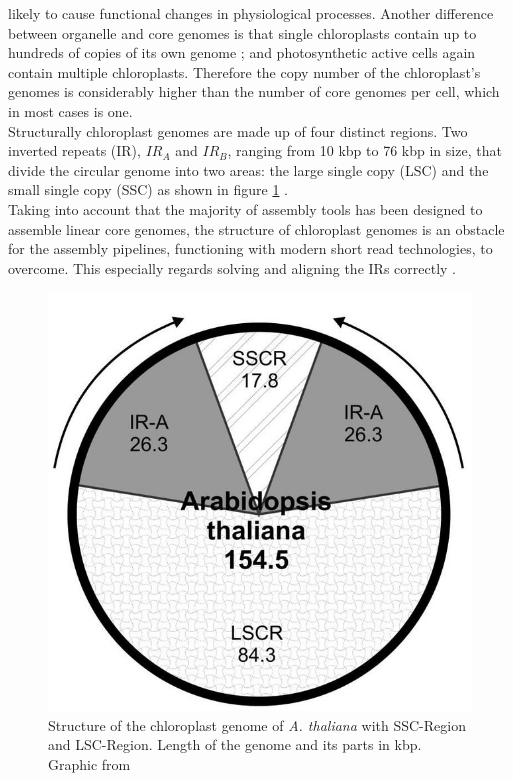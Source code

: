likely to cause functional changes in physiological processes. Another difference between
organelle and core genomes is that single chloroplasts contain up to hundreds of copies of
its own genome \cite{kumar_2014}; \cite{bendich_1987} and photosynthetic active cells
again contain multiple chloroplasts.
Therefore the copy number of the chloroplast's genomes is considerably higher than the number of core genomes per cell, which in most cases is one. \\
Structurally chloroplast genomes are made up of four distinct regions. Two inverted
repeats (IR), $IR_A$ and $IR_B$, ranging from 10 kbp to 76 kbp in size, that divide the
circular genome into two areas: the large
single copy (LSC) and the small single copy (SSC) as shown in figure \ref{fig:cpast_genome} \cite{palmer_1985}.\\
Taking into account that the majority of assembly tools has been designed to assemble
linear core genomes, the structure of chloroplast genomes is an obstacle for the assembly
pipelines, functioning with modern short read technologies, to overcome. This especially
regards solving and aligning the IRs correctly \cite{Wang2018}.

\begin{figure}[H]
\centering
\includegraphics[height=.55\textheight, width=.95\textwidth]{Figures/cpast}
\decoRule
\caption[Structure of a chloroplast genome]{Structure of the chloroplast genome of \textit{A. thaliana} with SSC-Region and LSC-Region. Length of the genome and its parts in kbp. Graphic from \cite{olejniczak2016chloroplasts}}
\label{fig:cpast_genome}
\end{figure}

